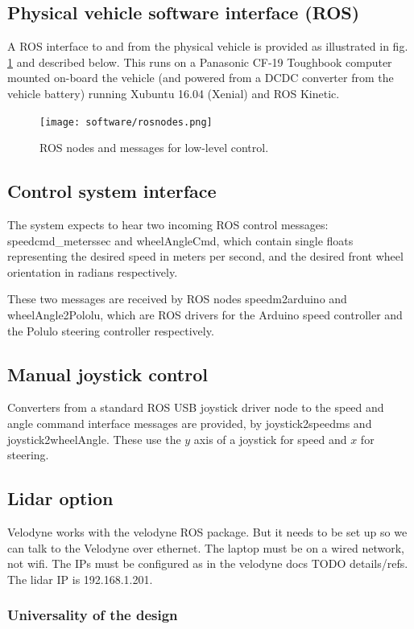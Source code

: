 \documentclass[a4paper]{article}
\begin{document}
\subsection{Physical vehicle software interface (ROS)}

A ROS interface to and from the physical vehicle is provided as illustrated in fig. \ref{fig:meshSim} and described below. This runs on a Panasonic CF-19 Toughbook computer mounted on-board the vehicle (and powered from a DCDC converter from the  vehicle battery) running Xubuntu 16.04 (Xenial) and ROS Kinetic.

\begin{figure}[h]
	\texttt{[image: software/rosnodes.png]}
	\caption{ROS nodes and messages for low-level control.}
	\label{fig:meshSim}
\end{figure}

\subsection{Control system interface}
The system expects to hear two incoming ROS control messages:     speedcmd\_meterssec and wheelAngleCmd, which contain single floats representing the desired speed in meters per second, and the desired front wheel orientation in radians respectively.

These two messages are received by ROS nodes speedm2arduino and wheelAngle2Pololu, which are ROS drivers for the Arduino speed controller and the Polulo steering controller respectively.

\subsection{Manual joystick control}
Converters from a standard ROS USB joystick driver node to the speed and angle command interface messages are provided, by joystick2speedms and joystick2wheelAngle.  These use the $y$ axis of a joystick for speed and $x$ for steering.

\subsection{Lidar option}
Velodyne works with the velodyne ROS package. But it needs to be set up so we can talk to the Velodyne over ethernet.  The laptop must be on a wired network, not wifi.   The IPs must be configured as in the velodyne docs TODO details/refs.  The lidar IP is 192.168.1.201.


\subsubsection{Universality of the design}\label{h.q32f2nclh4e5}
\end{document}
